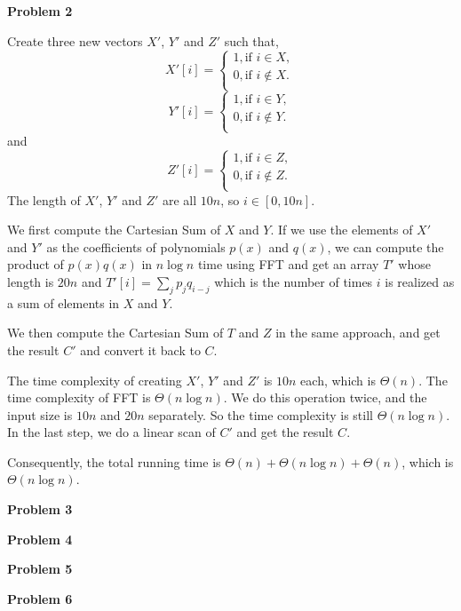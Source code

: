 \documentclass[12pt,letterpaper]{article}
\def\pp{\par\noindent}
\newcommand{\problem}[1]{ \bigskip \pp \textbf{Problem #1}\par}
\begin{document}
\problem{2}
Create three new vectors $X'$, $Y'$ and $Z'$ such that,
\[X'[i]=
\begin{cases}
	1, \text{if } i\in X,\\
	0, \text{if } i\notin X.\\
\end{cases}
\]
\[Y'[i]=
\begin{cases}
	1, \text{if } i\in Y,\\
	0, \text{if } i\notin Y.\\
\end{cases}
\]
and
\[Z'[i]=
\begin{cases}
	1, \text{if } i\in Z,\\
	0, \text{if } i\notin Z.\\
\end{cases}
\]
The length of $X'$, $Y'$ and $Z'$ are all $10n$, so $i\in [0, 10n]$.\par
We first compute the Cartesian Sum of $X$ and $Y$. If we use the elements of $X'$ and $Y'$ as the coefficients of polynomials $p(x)$ and $q(x)$, we can compute the product of $p(x)q(x)$ in $n\log n$ time using FFT and get an array $T'$ whose length is $20n$ and $T'[i]=\sum\limits_jp_jq_{i-j}$ which is the number of times $i$ is realized as a sum of elements in $X$ and $Y$.\par
We then compute the Cartesian Sum of $T$ and $Z$ in the same approach, and get the result $C'$ and convert it back to $C$.\par
The time complexity of creating $X'$, $Y'$ and $Z'$ is $10n$ each, which is $\Theta(n)$. The time complexity of FFT is $\Theta(n\log n)$. We do this operation twice, and the input size is $10n$ and $20n$ separately. So the time complexity is still $\Theta(n\log n)$. In the last step, we do a linear scan of $C'$ and get the result $C$.\par
Consequently, the total running time is $\Theta(n)+\Theta(n\log n)+\Theta(n)$, which is $\Theta(n\log n)$.

\problem{3}

\problem{4}

\problem{5}

\problem{6}
\end{document}
